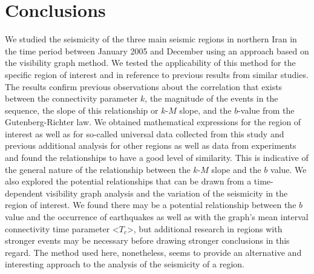 
\section{Conclusions}

We studied the seismicity of the three main seismic regions in northern Iran in the time period between January 2005 and December  using an approach based on the visibility graph method. We tested the applicability of this method for the specific region of interest and in reference to previous results from similar studies. The results confirm previous observations about the correlation that exists between the connectivity parameter $k$, the magnitude of the events in the sequence, the slope of this relationship or $k$-$M$ slope, and the $b$-value from the Gutenberg-Richter law. We obtained mathematical expressions for the region of interest as well as for so-called universal data collected from this study and previous additional analysis for other regions as well as data from experiments and found the relationships to have a good level of similarity. This is indicative of the general nature of the relationship between the $k$-$M$ slope and the $b$ value.  We also explored the potential relationships that can be drawn from a time-dependent visibility graph analysis and the variation of the seismicity in the region of interest. We found there may be a potential relationship between the $b$ value and the occurrence of earthquakes as well as with the graph's mean interval connectivity time parameter <$T_c$>, but additional research in regions with stronger events may be necessary before drawing stronger conclusions in this regard.  The method used here, nonetheless, seems to provide an alternative and interesting approach to the analysis of the seismicity of a region. 


